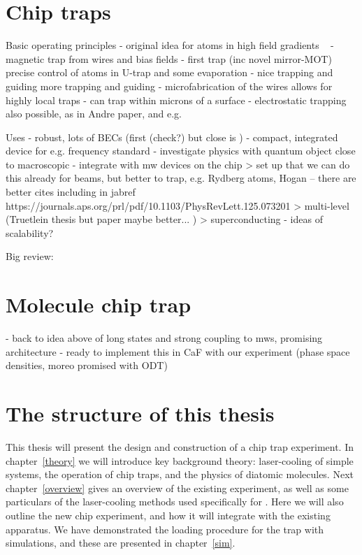\section{Chip traps}

Basic operating principles
- original idea for atoms in high field gradients ~\cite{PhysRevA.52.4004}
- magnetic trap from wires and bias fields
- first trap \cite{Reichel1999} (inc novel mirror-MOT) precise control of
atoms in U-trap and some evaporation
- nice trapping and guiding \cite{Folman2000} more trapping and guiding
- microfabrication of the wires allows for highly local traps
- can trap within microns of a surface
- electrostatic trapping also possible, as in Andre paper, and e.g.
\cite{Bethlem2000}

Uses
- robust, lots of BECs (first (check?) \cite{Haensel2001} but close is \cite{Ott2001})
- compact, integrated device for e.g. frequency standard \cite{RAMIREZMARTINEZ2011247}
- investigate physics with quantum object close to macroscopic
- integrate with mw devices on the chip
    > set up that we can do this already for beams, but better to trap, e.g.
      Rydberg atoms, Hogan -- there are better cites including in jabref
      https://journals.aps.org/prl/pdf/10.1103/PhysRevLett.125.073201
    > multi-level (Truetlein thesis \cite{Treutlein2008} but paper maybe
      better... \cite{Boehi2009})
    > superconducting \cite{Bernon2013}
- ideas of scalability?

Big review: \cite{2011Ac}

\section{Molecule chip trap}

- back to idea above of long states and strong coupling to mws, promising
architecture \cite{Andre2006}
- ready to implement this in CaF with our experiment (phase space densities,
moreo promised with ODT)

\section{The structure of this thesis}

This thesis will present the design and construction of a \CaF{} chip trap
experiment. In chapter~\ref{theory} we will introduce key background theory: 
laser-cooling of simple systems, the operation of chip traps, and the physics
of diatomic molecules. Next chapter~\ref{overview} gives an overview of the
existing \CaF{} experiment, as well as some particulars of the laser-cooling
methods used specifically for \CaF{}. Here we will also outline the new chip
experiment, and how it will integrate with the existing apparatus. We have
demonstrated the loading procedure for the trap with simulations, and these are
presented in chapter~\ref{sim}.

